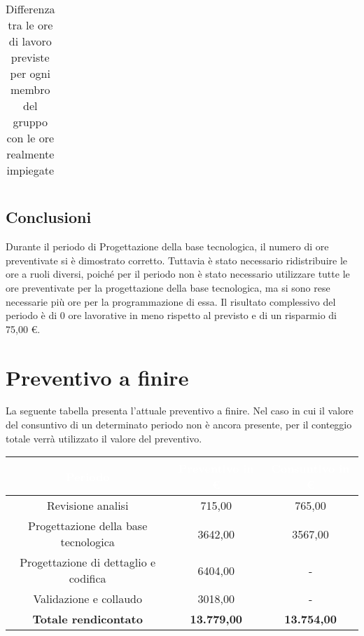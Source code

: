 \begin{flushleft}
\begin{table}[!h]
\begin{center}
\begin{tabularx}{\textwidth}{|c|cccccc|c|}
   	\end{tabularx}
  	\caption{Differenza tra le ore di lavoro previste per ogni membro del gruppo con le ore realmente impiegate }
\end{center}
\end{table}
  
  \subsection{Conclusioni}
  Durante il periodo di Progettazione della base tecnologica, il numero di ore preventivate si è dimostrato corretto. Tuttavia è stato necessario ridistribuire le ore a ruoli diversi, poiché per il periodo non è stato necessario utilizzare tutte le ore preventivate per la progettazione della base tecnologica, ma si sono rese necessarie più ore per la programmazione di essa. 
  Il risultato complessivo del periodo è di 0 ore lavorative in meno rispetto al previsto e di un risparmio di 75,00 \euro.
  
  \newpage

  \section{Preventivo a finire}
  La seguente tabella presenta l'attuale preventivo a finire. Nel caso in cui il valore del consuntivo di un determinato periodo non è ancora presente, per il conteggio totale verrà utilizzato il valore del preventivo.
  

  
	\begin{table}[!h]
  
	\begin{center}
  
  
		\begin{tabular}{ccc}
  
			\rowcolor{coolblack}
  
			\hline
  
			\textcolor{white}{Periodo} & \textcolor{white}{Preventivo in \euro} & \textcolor{white}{Consuntivo in \euro}\\
  
			\hline
			Revisione analisi   & 715,00	&  765,00  			 	\\ 
			Progettazione della base tecnologica &  3642,00 &  3567,00 \\ 
			Progettazione di dettaglio e codifica    & 6404,00  &  -	\\ 
			Validazione e collaudo    & 3018,00 & - 	\\ \hline
			\textbf{Totale rendicontato}& \textbf{13.779,00} & \textbf{13.754,00}	\\ \hline   
  

\end{tabular}
\end{center}
\end{table}
\end{flushleft}

